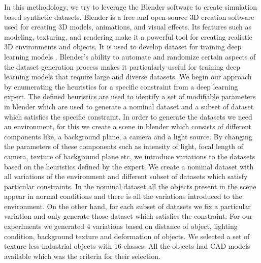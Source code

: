 In this methodology, we try to leverage the Blender software to create simulation based synthetic datasets. Blender \cite{Blender}  is a free and open-source 3D creation software used for creating 3D models, animations, and visual effects. Its features such as modeling, texturing, and rendering make it a powerful tool for creating realistic 3D environments and objects. It is used to develop dataset for training deep learning models \cite{Denninger2023}. Blender's ability to automate and randomize certain aspects of the dataset generation process makes it particularly useful for training deep learning models that require large and diverse datasets. We begin our approach by enumerating the heuristics for a specific constraint from a deep learning expert. The defined heuristics are used to identify a set of modifiable  parameters in blender which are used to generate a nominal dataset and a subset of dataset which satisfies the specific constraint. 
In order to generate the datasets we need an environment, for this we create a scene in blender which consists of different components like, a background plane, a camera and a light source. By changing the parameters of these components such as intensity of light, focal length of camera, texture of background plane etc, we introduce variations to the datasets based on the heuristics defined by the expert. 
We create a nominal dataset with all variations of the environment and different subset of datasets which satisfy particular constraints. In the nominal dataset all the objects present in the scene appear in normal conditions and there is all the variations introduced to the environment. On the other hand, for each subset of datasets we fix a particular variation and only generate those dataset which satisfies the constraint. For our experiments we generated  4 variations based on distance of object, lighting condition, background texture and deformation of objects.
We selected a set of texture less industrial objects with 16 classes. All the objects had CAD models available which was the criteria for their selection. 
